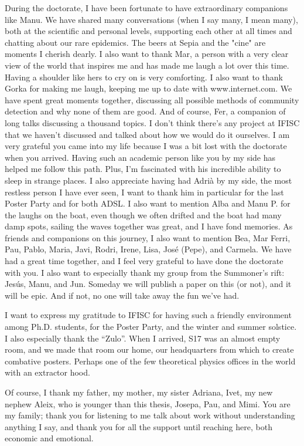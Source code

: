 During the doctorate, I have been fortunate to have extraordinary companions like Manu. We have shared many conversations (when I say many, I mean many), both at the scientific and personal levels, supporting each other at all times and chatting about our rare epidemics. The beers at Sepia and the "cine" are moments I cherish dearly. I also want to thank Mar, a person with a very clear view of the world that inspires me and has made me laugh a lot over this time. Having a shoulder like hers to cry on is very comforting. I also want to thank Gorka for making me laugh, keeping me up to date with www.internet.com. We have spent great moments together, discussing all possible methods of community detection and why none of them are good. And of course, Fer, a companion of long talks discussing a thousand topics. I don't think there's any project at IFISC that we haven't discussed and talked about how we would do it ourselves. I am very grateful you came into my life because I was a bit lost with the doctorate when you arrived. Having such an academic person like you by my side has helped me follow this path. Plus, I'm fascinated with his incredible ability to sleep in strange places. I also appreciate having had Adrià by my side, the most restless person I have ever seen, I want to thank him in particular for the last Poster Party and for both ADSL. I also want to mention Alba and Manu P. for the laughs on the boat, even though we often drifted and the boat had many damp spots, sailing the waves together was great, and I have fond memories. As friends and companions on this journey, I also want to mention Bea, Mar Ferri, Pau, Pablo, Maria, Javi, Rodri, Irene, Lisa, José (Pepe), and Carmela. We have had a great time together, and I feel very grateful to have done the doctorate with you. I also want to especially thank my group from the Summoner's rift: Jesús, Manu, and Jun. Someday we will publish a paper on this (or not), and it will be epic. And if not, no one will take away the fun we've had.

I want to express my gratitude to IFISC for having such a friendly environment among Ph.D. students, for the Poster Party, and the winter and summer solstice. I also especially thank the ``Zulo''. When I arrived, S17 was an almost empty room, and we made that room our home, our headquarters from which to create combative posters. Perhaps one of the few theoretical physics offices in the world with an extractor hood.

Of course, I thank my father, my mother, my sister Adriana, Ivet, my new nephew Aleix, who is younger than this thesis, Josepa, Pau, and Mimi. You are my family; thank you for listening to me talk about work without understanding anything I say, and thank you for all the support until reaching here, both economic and emotional.

